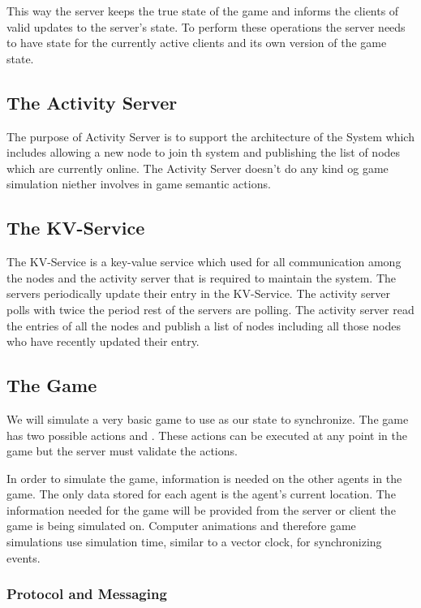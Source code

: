 	This way the server keeps the true state of the game and informs the clients of valid updates to the server's state. To perform these operations the server needs to have state for the currently active clients and its own version of the game state.

\subsection{The Activity Server}
	The purpose of Activity Server is to support the architecture of the System which includes allowing a new node to join th system and publishing the list of nodes which are currently online. The Activity Server doesn't do any kind og game simulation niether involves in game semantic actions.

\subsection{The KV-Service}
	The KV-Service is a key-value service which used for all communication among the nodes and the activity server that is required to maintain the system. The servers periodically update their entry in the KV-Service. The activity server polls with twice the period rest of the servers are polling. The activity server read the entries of all the nodes and publish a list of nodes including all those nodes who have recently updated their entry. 

\subsection{The Game}

	We will simulate a very basic game to use as our state to synchronize. 
	The game has two possible actions \move{\agent}{\position} and . These actions can be executed at any point in the game but the server must validate the actions. 
	
	In order to simulate the game, information is needed on the other agents in the game. The only data stored for each agent is the agent's current location. The information needed for the game will be provided from the server or client the game is being simulated on. Computer animations and therefore game simulations use simulation time, similar to a vector clock, for synchronizing events.
	
\subsubsection{Protocol and Messaging}

